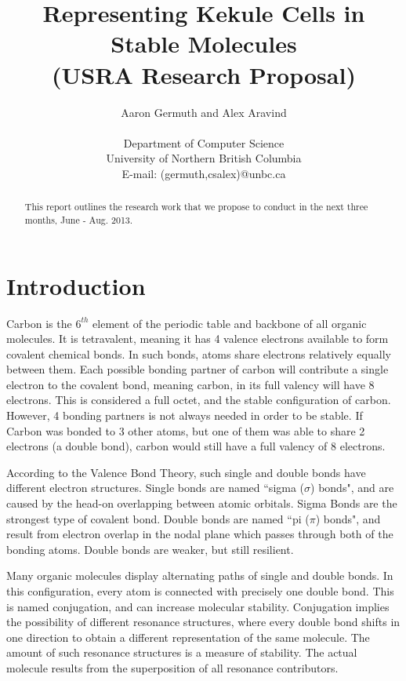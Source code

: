\documentclass[12pt]{article}
\begin{document}
\title{Representing Kekule Cells in Stable Molecules \\ (USRA Research Proposal)}
\author{Aaron Germuth and Alex Aravind \\\\  
Department of Computer Science \\
University of Northern British Columbia \\
E-mail: (germuth,csalex)@unbc.ca}
\maketitle


\begin{abstract}

This report outlines the research work that we propose to conduct in the next three months, June - Aug. 2013.

\end{abstract}

\section{Introduction}

Carbon is the $6^{th}$ element of the periodic table and backbone of all organic molecules. It is tetravalent, meaning it has 4 valence electrons available to form covalent chemical bonds. In such bonds, atoms share electrons relatively equally between them. Each possible bonding partner of carbon will contribute a single electron to the covalent bond, meaning carbon, in its full valency will have 8 electrons. This is considered a full octet, and the stable configuration of carbon. However, 4 bonding partners is not always needed in order to be stable. If Carbon was bonded to 3 other atoms, but one of them was able to share 2 electrons (a double bond), carbon would still have a full valency of 8 electrons.

According to the Valence Bond Theory, such single and double bonds have different electron structures. Single bonds are named ``sigma ($\sigma$) bonds", and are caused by the head-on overlapping between atomic orbitals. Sigma Bonds are the strongest type of covalent bond. Double bonds are named ``pi ($\pi$) bonds", and result from electron overlap in the nodal plane which passes through both of the bonding atoms. Double bonds are weaker, but still resilient.

Many organic molecules display alternating paths of single and double bonds. In this configuration, every atom is connected with precisely one double bond. This is named conjugation, and can increase molecular stability. Conjugation implies the possibility of different resonance structures, where every double bond shifts in one direction to obtain a different representation of the same molecule. The amount of such resonance structures is a measure of stability. The actual molecule results from the superposition of all resonance contributors.
\end{document}
